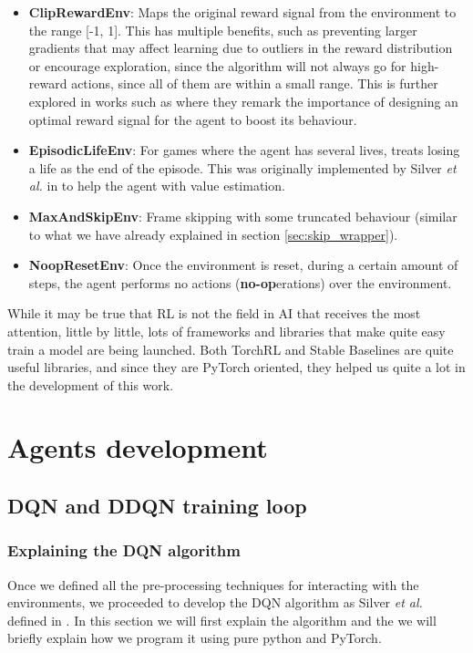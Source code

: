 \begin{itemize}
	\item \textbf{ClipRewardEnv}: Maps the original reward signal from the environment to the range [-1, 1]. This has multiple benefits, such as preventing larger gradients that may affect learning due to outliers in the reward distribution or encourage exploration, since the algorithm will not always go for high-reward actions, since all of them are within a small range. This is further explored in works such as \cite{Eschmann2021} where they remark the importance of designing an optimal reward signal for the agent to boost its behaviour.
	\item \textbf{EpisodicLifeEnv}: For games where the agent has several lives, treats losing a life as the end of the episode. This was originally implemented by Silver \textit{et al.} in \cite{mnih2013playing} to help the agent with value estimation.
	\item \textbf{MaxAndSkipEnv}: Frame skipping with some truncated behaviour (similar to what we have already explained in section \ref{sec:skip_wrapper}).
	\item \textbf{NoopResetEnv}: Once the environment is reset, during a certain amount of steps, the agent performs no actions (\textbf{no-op}erations) over the environment.
\end{itemize}

 While it may be true that RL is not the field in AI that receives the most attention, little by little, lots of frameworks and libraries that make quite easy train a model are being launched. Both TorchRL and Stable Baselines are quite useful libraries, and since they are PyTorch oriented, they helped us quite a lot in the development of this work.

\section{Agents development}
\label{sec:agents_dev}

\subsection{DQN  and DDQN training loop}
\label{sec:dqn_training_loop}
\subsubsection{Explaining the DQN algorithm}
Once we defined all the pre-processing techniques for interacting with the environments, we proceeded to develop the DQN algorithm as Silver \textit{et al.} defined in \cite{mnih2013playing}. In this section we will first explain the algorithm and the we will briefly explain how we program it using pure python and PyTorch.

